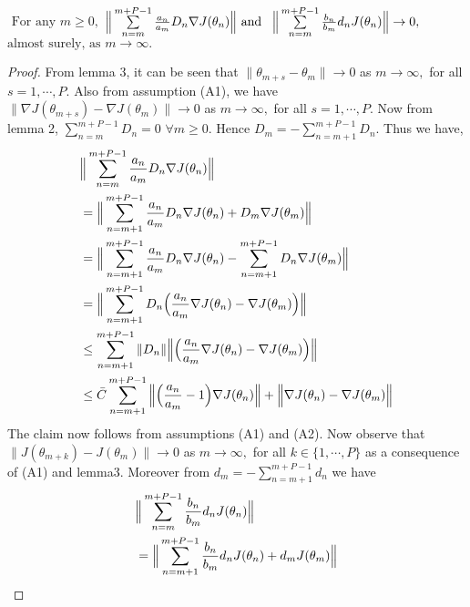 \begin{lemma}
$\text{ For any } m \geq0,$
$\Big{\|}\sum\limits_{n=m}^{m+P-1}\frac{a_n}{a_m}D_n\nabla J(\theta_n)\Big{\|} \text{ and }$
$\Big{\|}\sum\limits_{n=m}^{m+P-1}\frac{b_n}{b_m}d_nJ(\theta_n)\Big{\|}\rightarrow 0,$
$\text{almost surely, as } m \rightarrow \infty.$
\end{lemma}
\begin{proof}
 From lemma 3, it can be seen that
  $\|\theta_{m+s}-\theta_{m}\|\rightarrow 0$ as $m\rightarrow \infty,$
 for all $s=1,\cdots,P.$ Also from assumption (A1), we have
 $\|\nabla J(\theta_{m+s})-\nabla J(\theta_{m})\|\rightarrow 0$ as $m\rightarrow \infty,$
 for all $s=1,\cdots,P.$ Now from lemma 2, $\sum\limits_{n=m}^{m+P-1}D_n=0$ $\forall m\geq0.$
 Hence $D_m=-\sum\limits_{n=m+1}^{m+P-1}D_n.$ Thus we have, 
 \begin{align*}
  &\Big{\|}\sum_{n=m}^{m+P-1}\frac{a_n}{a_m}D_n\nabla J(\theta_n)\Big{\|}\\
  & = \Big{\|}\sum_{n=m+1}^{m+P-1}\frac{a_n}{a_m}D_n\nabla J(\theta_n)
  +D_{m}\nabla J(\theta_{m})\Big{\|}\\
  &=\Big{\|}\sum_{n=m+1}^{m+P-1}\frac{a_n}{a_m}D_n \nabla J(\theta_n)
     -\sum_{n=m+1}^{m+P-1}D_n\nabla J(\theta_{m})\Big{\|}\\
  &=\Big{\|}\sum_{n=m+1}^{m+P-1}D_n\Big{(}\frac{a_n}{a_m}\nabla J(\theta_n)
  -\nabla J(\theta_{m})\Big{)}\Big{\|}\\
  &\leq\sum_{n=m+1}^{m+P-1}{\|}D_n{\|}\Big{\|}\Big{(}\frac{a_n}{a_m}\nabla J(\theta_n)
  -\nabla J(\theta_{m})\Big{)}\Big{\|}\\
  &\leq \bar{C}\sum_{n=m+1}^{m+P-1}\Big{\|}\Big{(}\frac{a_n}{a_m}-1\Big{)}\nabla J(\theta_n)\Big{\|}
  +\Big{\|}\nabla J(\theta_n)-\nabla J(\theta_{m})\Big{\|}
 \end{align*}
 The claim now follows from assumptions (A1) and (A2).
 Now observe that $\|J(\theta_{m+k})-J(\theta_{m})\|\rightarrow 0$ as $m\rightarrow \infty,$
 for all $k \in \{1,\cdots,P\}$ as a consequence of (A1)
 and lemma3. Moreover from $d_m=-\sum\limits_{n=m+1}^{m+P-1}d_n$ we have
\begin{align*}
  & \Big{\|}\sum_{n=m}^{m+P-1}\frac{b_n}{b_m}d_n J(\theta_n)\Big{\|}\\
  & =\Big{\|}\sum_{n=m+1}^{m+P-1}\frac{b_n}{b_m}d_n J(\theta_n)+d_m J(\theta_{m})\Big{\|}\\

\end{align*}
\end{proof}
